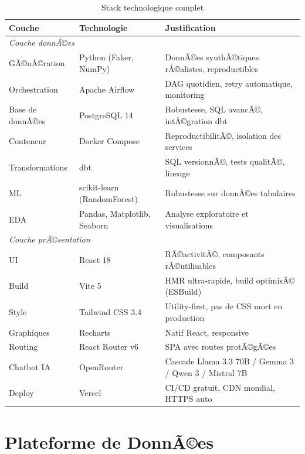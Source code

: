 \documentclass[12pt,a4paper]{report}
\begin{document}
\begin{table}[h!]
\centering
\caption{Stack technologique complet}
\label{tab:stack}
\begin{tabularx}{\textwidth}{l l X}
\toprule
\rowcolor{marine!10}
Couche & Technologie & Justification \\
\midrule
\multicolumn{3}{l}{\textit{Couche donnÃ©es}} \\
GÃ©nÃ©ration  & Python (Faker, NumPy)       & DonnÃ©es synthÃ©tiques rÃ©alistes, reproductibles \\
Orchestration & Apache Airflow            & DAG quotidien, retry automatique, monitoring \\
Base de donnÃ©es & PostgreSQL 14           & Robustesse, SQL avancÃ©, intÃ©gration dbt \\
Conteneur   & Docker Compose              & ReproductibilitÃ©, isolation des services \\
Transformations & dbt                     & SQL versionnÃ©, tests qualitÃ©, lineage \\
ML          & scikit-learn (RandomForest) & Robustesse sur donnÃ©es tabulaires \\
EDA         & Pandas, Matplotlib, Seaborn & Analyse exploratoire et visualisations \\
\midrule
\multicolumn{3}{l}{\textit{Couche prÃ©sentation}} \\
UI          & React 18                    & RÃ©activitÃ©, composants rÃ©utilisables \\
Build       & Vite 5                      & HMR ultra-rapide, build optimisÃ© (ESBuild) \\
Style       & Tailwind CSS 3.4            & Utility-first, pas de CSS mort en production \\
Graphiques  & Recharts                    & Natif React, responsive \\
Routing     & React Router v6             & SPA avec routes protÃ©gÃ©es \\
Chatbot IA  & OpenRouter                  & Cascade Llama 3.3 70B / Gemma 3 / Qwen 3 / Mistral 7B \\
Deploy      & Vercel                      & CI/CD gratuit, CDN mondial, HTTPS auto \\
\bottomrule
\end{tabularx}
\end{table}

\chapter{Plateforme de DonnÃ©es}
\label{ch:data}
\end{document}

